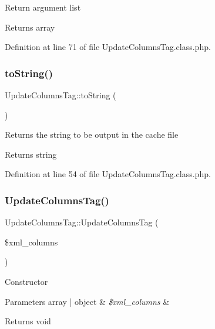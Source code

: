 Return argument list

\begin{DoxyReturn}{Returns}
array 
\end{DoxyReturn}


Definition at line 71 of file Update\+Columns\+Tag.\+class.\+php.

\hypertarget{classUpdateColumnsTag_a7653306405140623b429c3751ac11d7f}{}\label{classUpdateColumnsTag_a7653306405140623b429c3751ac11d7f} 
\subsubsection{\texorpdfstring{to\+String()}{toString()}}
{\footnotesize\ttfamily Update\+Columns\+Tag\+::to\+String (\begin{DoxyParamCaption}{ }\end{DoxyParamCaption})}

Returns the string to be output in the cache file

\begin{DoxyReturn}{Returns}
string 
\end{DoxyReturn}


Definition at line 54 of file Update\+Columns\+Tag.\+class.\+php.

\hypertarget{classUpdateColumnsTag_ac046fb7c43564e290d1022aa8299e1aa}{}\label{classUpdateColumnsTag_ac046fb7c43564e290d1022aa8299e1aa} 
\subsubsection{\texorpdfstring{Update\+Columns\+Tag()}{UpdateColumnsTag()}}
{\footnotesize\ttfamily Update\+Columns\+Tag\+::\+Update\+Columns\+Tag (\begin{DoxyParamCaption}\item[{}]{\$xml\+\_\+columns }\end{DoxyParamCaption})}

Constructor


\begin{DoxyParams}[1]{Parameters}
array | object & {\em \$xml\+\_\+columns} & \\
\hline
\end{DoxyParams}
\begin{DoxyReturn}{Returns}
void 
\end{DoxyReturn}


